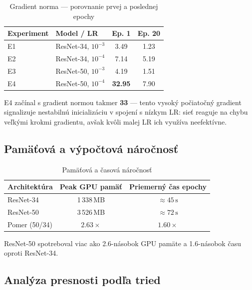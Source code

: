 \documentclass[12pt,a4paper]{article}
\begin{document}
\begin{table}[H]
\centering
\caption{Gradient norma — porovnanie prvej a poslednej epochy}
\begin{tabular}{llcc}
\toprule
\textbf{Experiment} & \textbf{Model / LR} & \textbf{Ep. 1} & \textbf{Ep. 20} \\
\midrule
E1 & ResNet-34, $10^{-3}$ & 3.49 & 1.23 \\
E2 & ResNet-34, $10^{-4}$ & 7.14 & 5.19 \\
E3 & ResNet-50, $10^{-3}$ & 4.19 & 1.51 \\
E4 & ResNet-50, $10^{-4}$ & \textbf{32.95} & 7.90 \\
\bottomrule
\end{tabular}
\end{table}

E4 začínal s gradient normou takmer \textbf{33} — tento vysoký počiatočný gradient
signalizuje nestabilnú inicializáciu v spojení s nízkym LR: sieť reaguje na chybu
veľkými krokmi gradientu, avšak kvôli malej LR ich využíva neefektívne.

\subsection{Pamäťová a výpočtová náročnosť}

\begin{table}[H]
\centering
\caption{Pamäťová a časová náročnosť}
\begin{tabular}{lcc}
\toprule
\textbf{Architektúra} & \textbf{Peak GPU pamäť} & \textbf{Priemerný čas epochy} \\
\midrule
ResNet-34 & 1\,338\,MB & $\approx 45\,\text{s}$ \\
ResNet-50 & 3\,526\,MB & $\approx 72\,\text{s}$ \\
\midrule
Pomer (50/34) & $\mathbf{2.63\times}$ & $\mathbf{1.60\times}$ \\
\bottomrule
\end{tabular}
\end{table}

ResNet-50 spotreboval viac ako 2.6-násobok GPU pamäte a 1.6-násobok času oproti
ResNet-34.

\subsection{Analýza presnosti podľa tried}
\end{document}
